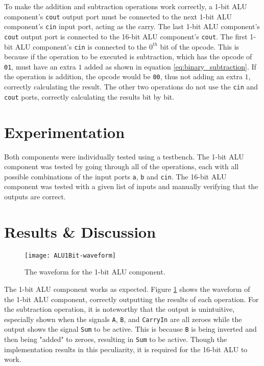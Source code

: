 \documentclass[11pt]{report}
\begin{document}
To make the addition and subtraction operations work correctly, a 1-bit ALU component's \verb|cout|
output port must be connected to the next 1-bit ALU component's \verb|cin| input port, acting as the
carry. The last 1-bit ALU component's \verb|cout| output port is connected to the 16-bit ALU
component's \verb|cout|. The first 1-bit ALU component's \verb|cin| is connected to the $0^{th}$ bit
of the opcode. This is because if the operation to be executed is subtraction, which has the opcode
of \verb|01|, must have an extra $1$ added as shown in equation \ref{eq:binary_subtraction}. If the
operation is addition, the opcode would be \verb|00|, thus not adding an extra $1$, correctly
calculating the result. The other two operations do not use the \verb|cin| and \verb|cout| ports,
correctly calculating the results bit by bit.


\section*{Experimentation}
Both components were individually tested using a testbench. The 1-bit ALU component was tested by
going through all of the operations, each with all possible combinations of the input ports
\verb|a|, \verb|b| and \verb|cin|. The 16-bit ALU component was tested with a given list of inputs
and manually verifying that the outputs are correct.

\section*{Results \& Discussion}
\begin{figure}[h!]
    \centering
    \texttt{[image: ALU1Bit-waveform]}
    \caption{The waveform for the 1-bit ALU component.}
    \label{fig:ALU1Bit-waveform}
\end{figure}

The 1-bit ALU component works as expected. Figure \ref{fig:ALU1Bit-waveform} shows the waveform of
the 1-bit ALU component, correctly outputting the results of each operation. For the subtraction
operation, it is noteworthy that the output is unintuitive, especially shown when the signals
\verb|A|, \verb|B|, and \verb|CarryIn| are all zeroes while the output shows the signal \verb|Sum|
to be active. This is because \verb|B| is being inverted and then being "added" to zeroes, resulting
in \verb|Sum| to be active. Though the implementation results in this peculiarity, it is required
for the 16-bit ALU to work.
\end{document}

